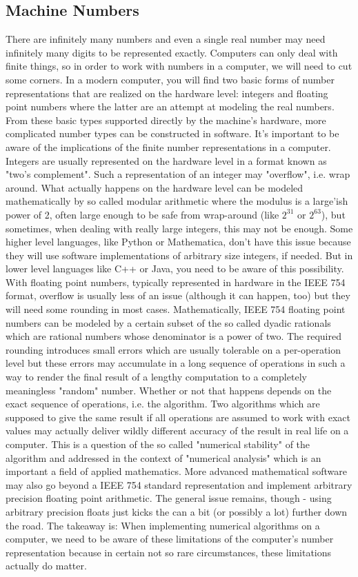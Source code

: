 \subsection{Machine Numbers}
There are infinitely many numbers and even a single real number may need infinitely many digits to be represented exactly. Computers can only deal with finite things, so in order to work with numbers in a computer, we will need to cut some corners. In a modern computer, you will find two basic forms of number representations that are realized on the hardware level: integers and floating point numbers where the latter are an attempt at modeling the real numbers. From these basic types supported directly by the machine's hardware, more complicated number types can be constructed in software. It's important to be aware of the implications of the finite number representations in a computer. Integers are usually represented on the hardware level in a format known as "two's complement". Such a representation of an integer may "overflow", i.e. wrap around. What actually happens on the hardware level can be modeled mathematically by so called modular arithmetic where the modulus is a large'ish power of 2, often large enough to be safe from wrap-around (like $2^{31}$ or $2^{63}$), but sometimes, when dealing with really large integers, this may not be enough. Some higher level languages, like Python or Mathematica, don't have this issue because they will use software implementations of arbitrary size integers, if needed. But in lower level languages like C++ or Java, you need to be aware of this possibility. With floating point numbers, typically represented in hardware in the IEEE 754 format, overflow is usually less of an issue (although it can happen, too) but they will need some rounding in most cases. Mathematically, IEEE 754 floating point numbers can be modeled by a certain subset of the so called dyadic rationals which are rational numbers whose denominator is a power of two. The required rounding introduces small errors which are usually tolerable on a per-operation level but these errors may accumulate in a long sequence of operations in such a way to render the final result of a lengthy computation to a completely meaningless "random" number. Whether or not that happens depends on the exact sequence of operations, i.e. the algorithm. Two algorithms which are supposed to give the same result if all operations are assumed to work with exact values may actually deliver wildly different accuracy of the result in real life on a computer. This is a question of the so called "numerical stability" of the algorithm and addressed in the context of "numerical analysis" which is an important a field of applied mathematics. More advanced mathematical software may also go beyond a IEEE 754 standard representation and implement arbitrary precision floating point arithmetic. The general issue remains, though - using arbitrary precision floats just kicks the can a bit (or possibly a lot) further down the road. The takeaway is: When implementing numerical algorithms on a computer, we need to be aware of these limitations of the computer's number representation because in certain not so rare circumstances, these limitations actually do matter.



